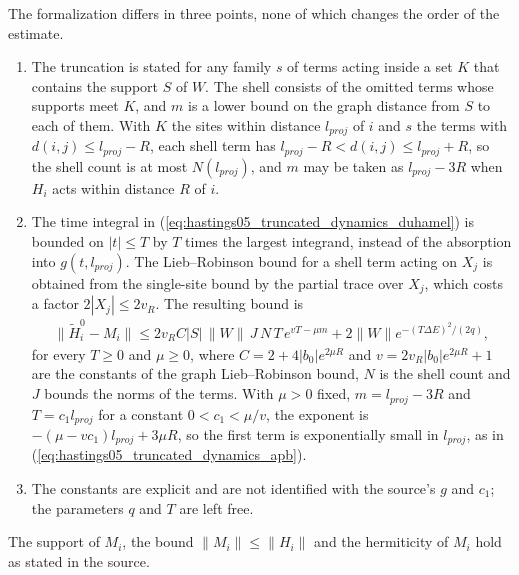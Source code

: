 \documentclass{article}
\begin{document}
The formalization differs in three points, none of which changes the order of
the estimate.
\begin{enumerate}
 \item The truncation is stated for any family $s$ of terms acting inside a set
  $K$ that contains the support $S$ of $W$. The shell consists of the omitted
  terms whose supports meet $K$, and $m$ is a lower bound on the graph
  distance from $S$ to each of them. With $K$ the sites within distance
  $l_{proj}$ of $i$ and $s$ the terms with $d(i,j)\le l_{proj}-R$, each shell
  term has $l_{proj}-R<d(i,j)\le l_{proj}+R$, so the shell count is at most
  $N(l_{proj})$, and $m$ may be taken as $l_{proj}-3R$ when $H_i$ acts within
  distance $R$ of $i$.
 \item The time integral in (\ref{eq:hastings05_truncated_dynamics_duhamel})
  is bounded on $|t|\le T$ by $T$ times the largest integrand, instead of the
  absorption into $g(t,l_{proj})$. The Lieb--Robinson bound for a shell term
  acting on $X_j$ is obtained from the single-site bound by the partial trace
  over $X_j$, which costs a factor $2|X_j|\le2v_R$. The resulting bound is
  \begin{align}
   \|\tilde H_i^0-M_i\|\le2v_RC|S|\,\|W\|\,J\,N\,T\,e^{vT-\mu m}
   +2\|W\|e^{-(T\Delta E)^2/(2q)},
  \end{align}
  for every $T\ge0$ and $\mu\ge0$, where $C=2+4|b_0|e^{2\mu R}$ and
  $v=2v_R|b_0|e^{2\mu R}+1$ are the constants of the graph Lieb--Robinson
  bound, $N$ is the shell count and $J$ bounds the norms of the terms. With
  $\mu>0$ fixed, $m=l_{proj}-3R$ and $T=c_1l_{proj}$ for a constant
  $0<c_1<\mu/v$, the exponent is $-(\mu-vc_1)l_{proj}+3\mu R$, so the first
  term is exponentially small in $l_{proj}$, as in
  (\ref{eq:hastings05_truncated_dynamics_apb}).
 \item The constants are explicit and are not identified with the source's
  $g$ and $c_1$; the parameters $q$ and $T$ are left free.
\end{enumerate}
The support of $M_i$, the bound $\|M_i\|\le\|H_i\|$ and the hermiticity of
$M_i$ hold as stated in the source.
\end{document}
